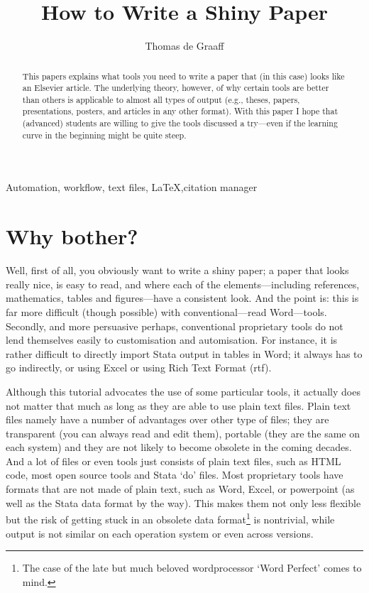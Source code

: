 \documentclass[preprint,authoryear,5p]{elsarticle}
\begin{document}
\begin{frontmatter}
	
	\title{How to Write a Shiny Paper} 
	\author{Thomas de Graaff}   \address{Department of Spatial Economics, Vrije Universiteit}
	\begin{abstract}
		This papers explains what tools you need to write a paper that (in this case) looks like an Elsevier article. The underlying theory, however, of why certain tools are better than others is applicable to almost all types of output (e.g., theses, papers, presentations, posters, and articles in any other format). With this paper I hope that (advanced) students are willing to give the tools discussed a try---even if the learning curve in the beginning might be quite steep. 
	\end{abstract}
	\begin{keyword}
		Automation, workflow, text files, \LaTeX \sep citation manager 
	\end{keyword}
\end{frontmatter}

\section{Why bother?} Well, first of all, you obviously want to write a shiny paper; a paper that looks really nice, is easy to read, and where each of the elements---including references, mathematics, tables and figures---have a consistent look. And the point is: this is far more difficult (though possible) with conventional---read Word---tools. Secondly, and more persuasive perhaps, conventional proprietary tools do not lend themselves easily to customisation and automisation. For instance, it is rather difficult to directly import Stata output in tables in Word; it always has to go indirectly, or using Excel or using Rich Text Format (rtf). 

Although this tutorial advocates the use of some particular tools, it actually does not matter that much as long as they are able to use plain text files. Plain text files namely have a number of advantages over other type of files; they are transparent (you can always read and edit them), portable (they are the same on each system) and they are not likely to become obsolete in the coming decades. And a lot of files or even tools just consists of plain text files, such as HTML code, most open source tools and Stata `do' files. Most proprietary tools have formats that are not made of plain text, such as Word, Excel, or powerpoint (as well as the Stata data format by the way). This makes them not only less flexible but the risk of getting stuck in an obsolete data format\footnote{The case of the late but much beloved wordprocessor `Word Perfect' comes to mind.} is nontrivial, while output is not similar on each operation system or even across versions. 
\end{document}
